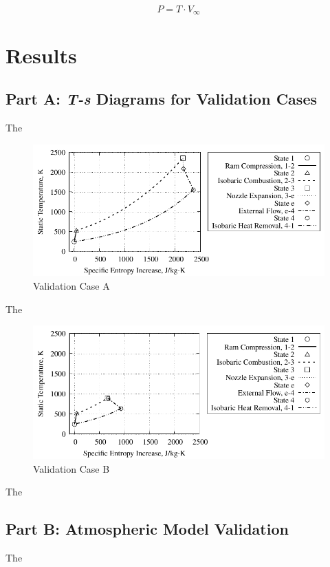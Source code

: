 \documentclass[conf]{new-aiaa} %
\begin{document}
\begin{equation}
    \label{eqn:P}
    P=T\cdot V_\infty
\end{equation}


\section{Results}
\subsection{Part A: \textit{T-s} Diagrams for Validation Cases}
The

\begin{figure}[hbt!] %
    \centering
    \includegraphics[]{media/ts_plot_files/TS_plot_for_case_7.pdf}
    \caption{\label{fig:partavalida}Validation Case A}
\end{figure}
The

\begin{figure}[hbt!] %
    \centering
    \includegraphics[]{media/ts_plot_files/TS_plot_for_case_8.pdf}
    \caption{\label{fig:partavalidb}Validation Case B}
\end{figure}
The

\subsection{Part B: Atmospheric Model Validation}
The
\end{document}
